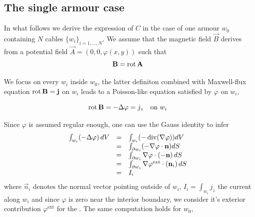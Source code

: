 \subsection*{The single armour case}
In what follows we derive the expression of $C$ in the case of one armour $w_0$ containing $N$ cables $\{ w_i \}_{i=1,...,N}$. We assume that the magnetic field $\vec{B}$ derives from a potential field $\vec{A}=(0,0,\varphi(x,y))$ such that 
\[
\label{def:B}
\mathbf B = \operatorname{rot}  \mathbf A
\]

We focus on every $w_i$ inside $w_0$, the latter definiton combined with Maxwell-flux equation $\operatorname{rot} \mathbf B = \mathbf j$ on $w_i$ leads to a Poisson-like equation satisfied by $\varphi$ on $w_i$,

\begin{equation}
\label{eq:poissonwi}
\operatorname{rot} \mathbf B = -\Delta \varphi = j_z \quad \text{on } w_i
\end{equation}

Since $\varphi$ is assumed regular enough, one can use the Gauss identity to infer
\begin{equation}
  \label{eq:traceeqn}
  \begin{array}{rcl}
    \int_{w_i} (-\Delta \varphi) \, dV &=& \int_{w_i} (- \operatorname{div} (\nabla \varphi))  dV \\
                                       &=& \int_{\partial w_i} (-\nabla\varphi \cdot \mathbf n) dS \\
                                       &=& \int_{\partial w_i} \nabla\varphi \cdot (-\mathbf n)  \, dS \\
                                       &=& \int_{ \partial w_i} \nabla\varphi^{\text{ext}} \cdot (\mathbf n_i)  \, dS \\
                                       &=& I_i \\
  \end{array}
\end{equation}
where $\vec{n}_i$ denotes the normal vector pointing outside of $w_i$, $I_i=\int_{w_i}j_z$ the current along $w_i$ and since $\varphi$ is zero near the interior boundary, we consider it's  exterior contribution $\varphi^{\text{ext}}$ for the . The same computation holds for $w_0$, 

